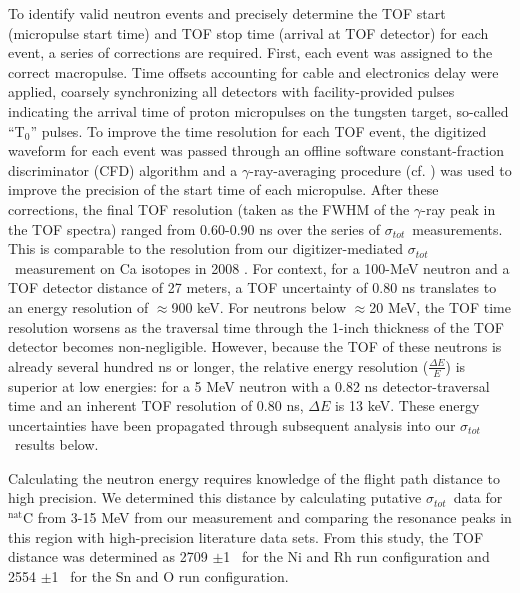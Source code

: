 \documentclass[twocolumn,secnumarabic,amssymb, nobibnotes, aps, prl,
superscriptaddress, nobalancelastpage]{revtex4}
\newcommand{\tot}{\ensuremath{\sigma_{tot}}}
\newcommand{\tZero}{T\ensuremath{_{0}}}
\begin{document}
To identify valid neutron events and precisely determine the TOF start (micropulse start 
time) and TOF stop time (arrival at TOF detector) for each event, a series of corrections 
are required.  First, each event was assigned to the correct macropulse.
Time offsets accounting for cable and
electronics delay were applied, coarsely synchronizing all detectors with
facility-provided pulses indicating the arrival time of proton micropulses on the
tungsten target, so-called ``\tZero'' pulses.
To improve the time resolution for each TOF
event, the digitized waveform for each event was passed 
through an offline software constant-fraction discriminator (CFD) algorithm
and a $\gamma$-ray-averaging
procedure (cf. \cite{Shane2010}) was used to improve the precision of the start 
time of each micropulse.  After these corrections, the final TOF resolution
(taken as the FWHM of the $\gamma$-ray peak in the TOF spectra) ranged from
0.60-0.90 ns over the series of \tot\ measurements.
This is comparable to the resolution from 
our digitizer-mediated \tot\ measurement on Ca isotopes in 2008 \cite{Shane2010}.
For context, for a 100-MeV neutron and a TOF detector distance of 27 meters, a TOF 
uncertainty of 0.80 ns translates to an energy resolution of $\approx$900 keV.
For neutrons below $\approx$20 MeV, the TOF time resolution worsens as the traversal time 
through the 1-inch thickness of the TOF detector becomes non-negligible.
However, because the TOF of these neutrons is already several hundred ns or
longer, the relative energy resolution ($\frac{\Delta E}{E}$) is
superior at low energies: for a 5 MeV neutron with a 0.82 ns detector-traversal time and
an inherent TOF resolution of 0.80 ns, $\Delta E$ is 13 keV. These energy uncertainties
have been propagated through subsequent analysis into our \tot\ results below.

Calculating the neutron energy requires knowledge of the flight path
distance to high precision. We determined this distance by calculating 
putative \tot\ data for $^{\text{nat}}$C from 3-15 MeV from our measurement and 
comparing the resonance peaks in this region with high-precision literature data
sets. From this study, the TOF distance was determined as 2709 $\pm$1
\centi\meter\ for the Ni and Rh run configuration and 2554
$\pm$1 \centi\meter\ for the Sn and O run configuration.
\end{document}
